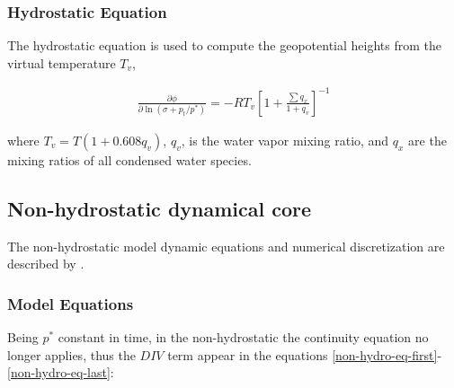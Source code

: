 \subsubsection{Hydrostatic Equation}

The hydrostatic equation is used to compute the geopotential heights from
the virtual temperature $T_v$,

\begin{eqnarray}
\frac{\partial{\phi}}{\partial{\ln(\sigma + p_t / p^{\ast})}} =
-RT_v \left[ 1 + \frac{\sum{q_x}}{1 + q_v} \right]^{-1}
\end{eqnarray}

where $T_v = T(1 + 0.608q_v)$, $q_v$, is the water vapor mixing ratio, and
$q_x$ are the mixing ratios of all condensed water species.

\newpage

\subsection{Non-hydrostatic dynamical core}
The non-hydrostatic model dynamic equations and numerical discretization are
described by \cite{Grell_94}.

\subsubsection{Model Equations}

Being $p^{\ast}$ constant in time, in the non-hydrostatic the continuity
equation no longer applies, thus the $DIV$ term appear in the equations
\ref{non-hydro-eq-first}-\ref{non-hydro-eq-last}:

